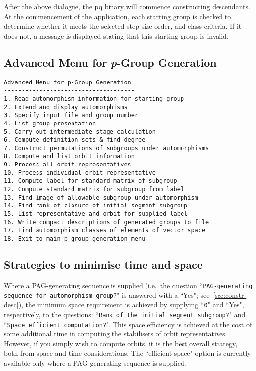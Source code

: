 \documentclass[12pt]{article}
\begin{document}
After the above dialogue, the pq binary will commence constructing
descendants. At the commencement of the application, each starting group
is checked to determine whether it meets the selected step size
order, and class criteria. If it does not, a message is displayed 
stating that this starting group is invalid. 

\enlargethispage*{2\baselineskip}
\subsection{Advanced Menu for {\it p}-Group Generation}
\label{sec:pgrp-gen-advanced-menu}
\begin{verbatim}
Advanced Menu for p-Group Generation
-------------------------------------
1. Read automorphism information for starting group
2. Extend and display automorphisms
3. Specify input file and group number
4. List group presentation
5. Carry out intermediate stage calculation
6. Compute definition sets & find degree
7. Construct permutations of subgroups under automorphisms
8. Compute and list orbit information
9. Process all orbit representatives
10. Process individual orbit representative
11. Compute label for standard matrix of subgroup
12. Compute standard matrix for subgroup from label
13. Find image of allowable subgroup under automorphism
14. Find rank of closure of initial segment subgroup
15. List representative and orbit for supplied label
16. Write compact descriptions of generated groups to file
17. Find automorphism classes of elements of vector space
18. Exit to main p-group generation menu
\end{verbatim}

\subsection{Strategies to minimise time and space}\label{sec:min-time-space}
Where a PAG-generating sequence is supplied (i.e.\ the question 
``\texttt{PAG-generating sequence for automorphism group?}" is answered with
a ``Yes"; see~\ref{sec:constr-desc}), the minimum space 
requirement is achieved by supplying ``\texttt{0}" and ``Yes",
respectively, to the questions:
``\texttt{Rank of the initial segment subgroup?}" and 
``\texttt{Space efficient computation?}".
This space efficiency is achieved at the cost of some additional
time in computing the stabilisers of orbit representatives.
However, if you simply wish to compute orbits, it is the 
best overall strategy, both from space and time considerations.
The ``efficient space" option is currently available only 
where a PAG-generating sequence is supplied. 
\end{document}
